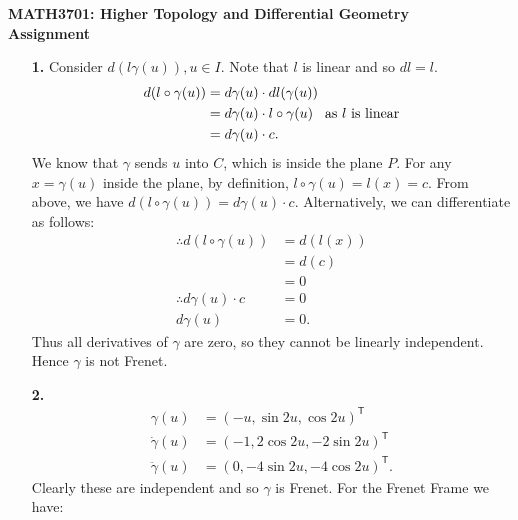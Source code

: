 \documentclass[a4paper]{article}
\newcommand{\ds}{\displaystyle}
\begin{document}
\hfill
{}
\begin{center}
  \vspace{-3mm}
	\textbf{\large {MATH3701: Higher Topology and Differential Geometry \\
	Assignment}}
\end{center}
\vspace{-5mm}
\hfill
{}

\begin{enumerate}[leftmargin=*]
\item[\textbf{1.}]
	Consider $\ds{d(l \gamma(u)), u \in I}$. Note that $\ds{l}$ is linear and so $\ds{dl = l}$.
	\begin{align*}
		d(l \circ \gamma(u)) & = d\gamma(u) \cdot dl(\gamma(u)) \\
							 & = d\gamma(u) \cdot l \circ \gamma(u) \hspace{3mm} \text{as $l$ is linear} \\
							 & = d\gamma(u) \cdot c.
	\end{align*}
	We know that $\ds{\gamma}$ sends $\ds{u}$ into $\ds{C}$, which is inside the plane $\ds{P}$. For any $\ds{x = \gamma(u)}$ inside the plane, by definition, $\ds{l \circ \gamma(u) =l(x) = c}$. From above, we have $\ds{d(l \circ \gamma(u)) = d\gamma(u) \cdot c}$. Alternatively, we can differentiate as follows:
	\begin{align*}
		\therefore d(l \circ \gamma(u)) & = d(l(x)) \\
										& = d(c) \\
										& = 0 \\
		\therefore d\gamma(u) \cdot c & = 0 \\
		d\gamma(u) & = 0.
	\end{align*}
	Thus all derivatives of $\ds{\gamma}$ are zero, so they cannot be linearly independent. Hence $\ds{\gamma}$ is not Frenet.
\item[\textbf{2.}]
	\begin{align*}
		\gamma(u) & = (-u,\sin{2u}, \cos{2u})^\mathsf{T} \\
		\dot{\gamma}(u) & = (-1, 2\cos{2u}, -2\sin{2u})^\mathsf{T} \\
		\ddot{\gamma}(u) & = (0, -4\sin{2u}, -4\cos{2u})^\mathsf{T}.
	\end{align*}
	Clearly these are independent and so $\ds{\gamma}$ is Frenet. For the Frenet Frame we have:
	\begin{align*}

\end{align*}
\end{enumerate}
\end{document}
